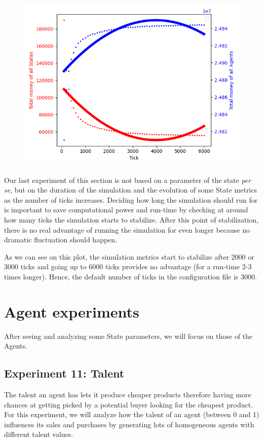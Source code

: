 {{{{{{{{{{{{{{{{        \begin{figure}
            \includegraphics[width=\linewidth]{img/exp/10_2.png}
        \end{figure} 
        { Our last experiment of this section is not based on a parameter of the state \emph{per se}, but on the duration of the simulation and the evolution of some State metrics as the number of ticks increases. Deciding how long the simulation should run for is important to save computational power and run-time by checking at around how many ticks the simulation starts to stabilize. After this point of stabilization, there is no real advantage of running the simulation for even longer because no dramatic fluctuation should happen. 
            
        As we can see on this plot, the simulation metrics start to stabilize after 2000 or 3000 ticks and going up to 6000 ticks provides no advantage (for a run-time 2-3 times longer). Hence, the default number of ticks in the configuration file is 3000.
        \par
    
\section{Agent experiments}
    After seeing and analyzing some State parameters, we will focus on those of the Agents.

    \subsection{Experiment 11: Talent}
    The talent an agent has lets it produce cheaper products therefore having more chances at getting picked by a potential buyer looking for the cheapest product. For this experiment, we will analyze how the talent of an agent (between 0 and 1) influences its sales and purchases by generating lots of homogeneous agents with different talent values.

}}}}}}}}}}}}}}}}}
